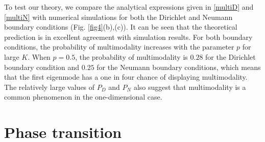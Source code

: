 \documentclass[a4paper,11pt]{article}
\begin{document}
To test our theory, we compare the analytical expressions given in \eqref{multiD} and \eqref{multiN} with numerical simulations for both the Dirichlet and Neumann boundary conditions (Fig. \ref{fig4}(b),(c)).
It can be seen that the theoretical prediction is in excellent agreement with simulation results. For both boundary conditions, the probability of multimodality increases with the parameter $p$ for large $K$. When $p = 0.5$, the probability of multimodality is $0.28$ for the Dirichlet boundary condition and $0.25$ for the Neumann boundary conditions, which means that the first eigenmode has a one in four chance of displaying multimodality. The relatively large values of $P_D$ and $P_N$ also suggest that multimodality is a common phenomenon in the one-dimensional case.


\section{Phase transition}\label{transition}
\end{document}
